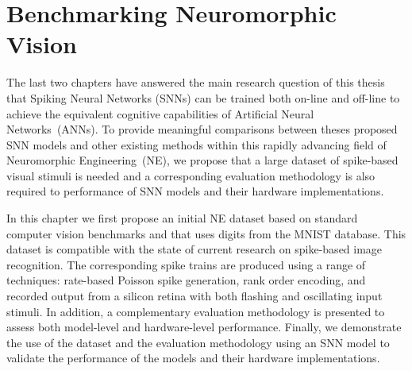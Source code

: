 \chapter{Benchmarking Neuromorphic Vision}
\label{cha:bench}


The last two chapters have answered the main research question of this thesis \DIFaddbegin {}\DIFaddend that Spiking Neural Networks (SNNs) can be trained both on-line and off-line to achieve the equivalent cognitive capabilities of Artificial Neural Networks~(ANNs).
To provide meaningful comparisons between theses proposed SNN models and other existing methods within this rapidly advancing field of Neuromorphic Engineering~(NE), we propose that a large dataset of spike-based visual stimuli is needed and a corresponding evaluation methodology is also required to \DIFdelbegin {}\DIFdelend \DIFaddbegin {}\DIFaddend performance of SNN models and their hardware implementations.

%

In this chapter we first propose an initial NE dataset based on standard computer vision benchmarks and that uses digits from the MNIST database.
This dataset is compatible with the state of current research on spike-based image recognition.
The corresponding spike trains are produced using a range of techniques: rate-based Poisson spike generation, rank order encoding, and recorded output from a silicon retina with both flashing and oscillating input stimuli.
In addition, a complementary evaluation methodology is presented to assess both model-level and hardware-level performance.
Finally, we demonstrate the use of the dataset and the evaluation methodology using an SNN model to validate the performance of the models and their hardware implementations.

